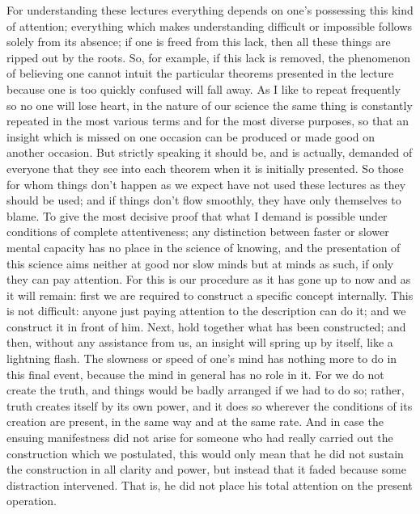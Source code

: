 For understanding these lectures everything depends
on one's possessing this kind of attention;
everything which makes understanding difficult
or impossible follows solely from its absence;
if one is freed from this lack,
then all these things are ripped out by the roots.
So, for example, if this lack is removed,
the phenomenon of believing one cannot intuit
the particular theorems presented in the lecture
because one is too quickly confused will fall away.
As I like to repeat frequently so no one will lose heart,
in the nature of our science the same thing is
constantly repeated in the most various terms
and for the most diverse purposes,
so that an insight which is
missed on one occasion can be produced
or made good on another occasion.
But strictly speaking it should be, and is actually,
demanded of everyone that they see into each theorem
when it is initially presented.
So those for whom things don't happen as we expect
have not used these lectures as they should be used;
and if things don't flow smoothly,
they have only themselves to blame.
To give the most decisive proof that
what I demand is possible under conditions
of complete attentiveness;
any distinction between faster or slower mental capacity has
no place in the science of knowing,
and the presentation of this science aims
neither at good nor slow minds
but at minds as such,
if only they can pay attention.
For this is our procedure as it has gone up to now
and as it will remain:
first we are required to construct
a specific concept internally.
This is not difficult:
anyone just paying attention to the
description can do it;
and we construct it in front of him.
Next, hold together what has been constructed;
and then, without any assistance from us,
an insight will spring up by itself,
like a lightning flash.
The slowness or speed of one's mind has
nothing more to do in this final event,
because the mind in general has no role in it.
For we do not create the truth,
and things would be badly arranged
if we had to do so;
rather, truth creates itself by its own power,
and it does so wherever the conditions
of its creation are present,
in the same way and at the same rate.
And in case the ensuing manifestness did not arise
for someone who had really carried out
the construction which we postulated,
this would only mean that he did not sustain
the construction in all clarity and power,
but instead that it faded
because some distraction intervened.
That is, he did not place his total attention
on the present operation.

